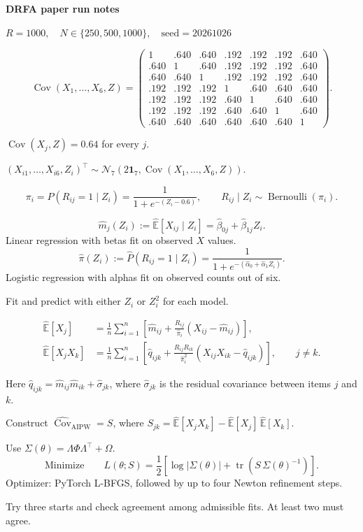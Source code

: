 \documentclass[10pt]{article}
\newcommand{\noteheading}[1]{\par\medskip{\large\bfseries #1}\par\nobreak}
\begin{document}
{\LARGE\bfseries DRFA paper run notes}\par
\noteheading{Constants}
\(R=1000,\quad N\in\{250,500,1000\},\quad \text{seed}=20261026\)

\[
\operatorname{Cov}(X_1,\ldots,X_6,Z)=
\begin{pmatrix}
1 & .640 & .640 & .192 & .192 & .192 & .640\\
.640 & 1 & .640 & .192 & .192 & .192 & .640\\
.640 & .640 & 1 & .192 & .192 & .192 & .640\\
.192 & .192 & .192 & 1 & .640 & .640 & .640\\
.192 & .192 & .192 & .640 & 1 & .640 & .640\\
.192 & .192 & .192 & .640 & .640 & 1 & .640\\
.640 & .640 & .640 & .640 & .640 & .640 & 1
\end{pmatrix}.
\]

\noteheading{DGP}
\(\operatorname{Cov}(X_j,Z)=0.64\) for every \(j\).

\((X_{i1},\ldots,X_{i6},Z_i)^\top
\sim \mathcal N_7(2\mathbf 1_7,\operatorname{Cov}(X_1,\ldots,X_6,Z))\).

\[
\pi_i=P(R_{ij}=1\mid Z_i)=\frac{1}{1+e^{-(Z_i-0.6)}},
\qquad R_{ij}\mid Z_i\sim\operatorname{Bernoulli}(\pi_i).
\]

\noteheading{Equations}
\[
\widehat m_j(Z_i):=\widehat{\mathbb E}[X_{ij}\mid Z_i]
=\widehat\beta_{0j}+\widehat\beta_{1j}Z_i.
\]
Linear regression with betas fit on observed \(X\) values.
\[
\widehat\pi(Z_i):=\widehat P(R_{ij}=1\mid Z_i)
=\frac{1}{1+e^{-(\widehat\alpha_0+\widehat\alpha_1Z_i)}}.
\]
Logistic regression with alphas fit on observed counts out of six.

Fit and predict with either \(Z_i\) or \(Z_i^2\) for each model.

\[
\begin{aligned}
\widehat{\mathbb E}[X_j]
&=\frac1n\sum_{i=1}^n\left[\widehat m_{ij}
+\frac{R_{ij}}{\widehat\pi_i}(X_{ij}-\widehat m_{ij})\right],\\
\widehat{\mathbb E}[X_jX_k]
&=\frac1n\sum_{i=1}^n\left[\widehat q_{ijk}
+\frac{R_{ij}R_{ik}}{\widehat\pi_i^2}
(X_{ij}X_{ik}-\widehat q_{ijk})\right],\qquad j\ne k.
\end{aligned}
\]

Here \(\widehat q_{ijk}=\widehat m_{ij}\widehat m_{ik}+\widehat\sigma_{jk}\),
where \(\widehat\sigma_{jk}\) is the residual covariance between items \(j\) and \(k\).

Construct \(\widehat{\operatorname{Cov}}_{\mathrm{AIPW}}=S\), where
\(S_{jk}=\widehat{\mathbb E}[X_jX_k]-\widehat{\mathbb E}[X_j]\,\widehat{\mathbb E}[X_k]\).

\noteheading{CFA}
Use \(\Sigma(\theta)=\Lambda\Phi\Lambda^\top+\Omega\).
\[
\text{Minimize}\qquad
L(\theta;S)=\frac12\left[\log|\Sigma(\theta)|
+\operatorname{tr}\!\left(S\,\Sigma(\theta)^{-1}\right)\right].
\]
Optimizer: PyTorch L-BFGS, followed by up to four Newton refinement steps.

Try three starts and check agreement among admissible fits. At least two must agree.
\end{document}
